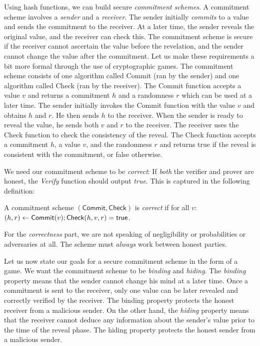Using hash functions, we can build secure \emph{commitment schemes}.
A commitment scheme involves a \emph{sender} and a \emph{receiver}. The sender initially
\emph{commits} to a value and sends the commitment to the receiver. At a later time, the
sender reveals the original value, and the receiver can check this. The commitment scheme
is secure if the receiver cannot ascertain the value before the revelation, and the sender
cannot change the value after the commitment. Let us make these requirements a bit more
formal through the use of cryptographic games.
The commitment scheme consists of one algorithm called \textsf{Commit} (ran by the sender)
and one algorithm called \textsf{Check} (ran by the receiver).
The \textsf{Commit} function accepts a value $v$ and returns a commitment $h$ and a randomness
$r$ which can be used at a later time. The sender initially invokes the \textsf{Commit}
function with the value $v$ and obtains $h$ and $r$. He then sends $h$ to the receiver.
When the sender is ready to reveal the value, he sends both $v$ and $r$ to the receiver.
The receiver uses the \textsf{Check} function to check the consistency of the reveal.
The \textsf{Check} function accepts a commitment $h$, a value $v$,
and the randomness $r$ and returns \textsf{true} if the reveal is consistent with the
commitment, or \textsf{false} otherwise.

We need our commitment
scheme to be \emph{correct}: If \emph{both} the verifier and prover are honest, the \emph{Verify}
function should output \emph{true}. This is captured in the following definition:

\begin{definition}
  A commitment scheme $(\textsf{Commit}, \textsf{Check})$ is \emph{correct} if
  for all $v$:
  $(h, r) \gets \textsf{Commit}(v); \textsf{Check}(h, v, r) = \textsf{true}$.
\end{definition}

For the \emph{correctness} part, we are not speaking of negligibility or probabilities
or adversaries at all. The scheme must \emph{always} work between honest parties.

Let us now state our goals for
a secure commitment scheme in the form of a game.
We want the commitment scheme to be
\emph{binding} and \emph{hiding}. The \emph{binding} property means that the sender
cannot change his mind at a later time. Once a commitment is sent to the receiver,
only one value can be later revealed and correctly verified by the receiver. The
binding property protects the honest receiver from a malicious sender. On the
other hand, the \emph{hiding} property means that the receiver cannot deduce
any information about the sender's value prior to the time of the reveal phase.
The hiding property protects the honest sender from a malicious sender.

